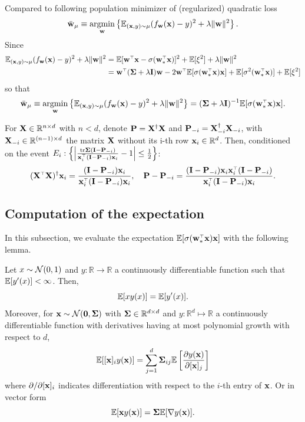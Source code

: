 \documentclass[11pt]{article}
\begin{document}
Compared to following population minimizer of (regularized) quadratic loss
\[
  \bar {\mathbf w}_\mu \equiv \operatorname*{\mathop{\mathrm{argmin}}}_\mathbf w \left\{ \mathbb E_{(\mathbf x,y) \sim \mu} (f_\mathbf w(\mathbf x) - y)^2 + \lambda \| \mathbf w \|^2 \right\}.
\]
Since 
\begin{align*}
  \E_{(\x,y) \sim \mu} (f_\w(\x) - y)^2 + \lambda \| \w \|^2 &= \E[\w^\top \x - \sigma(\w_*^\top \x)]^2 + \E[\xi^2]+ \lambda \| \w \|^2 \\ 
  & = \w^\top (\Sigmab + \lambda \I) \w - 2 \w^\top \E[\sigma(\w_*^\top \x) \x] + \E[\sigma^2(\w_*^\top \x)] + \E[\xi^2]
\end{align*}
so that 
\[
  \bar \w_\mu \equiv \argmin_\w \left\{ \E_{(\x,y) \sim \mu} (f_\w(\x) - y)^2 + \lambda \| \w \|^2 \right\} = (\Sigmab + \lambda \I)^{-1} \E[\sigma(\w_*^\top \x) \x].
\]


\begin{lemma}\label{lem:rank-one-update}
    For $\mathbf X \in \mathbb R^{n \times d}$ with $n<d$, denote $\mathbf P = \mathbf X^\dagger \mathbf X$ and $\mathbf P_{-i} = \mathbf X_{-i}^\dagger \mathbf X_{-i}$, with $\mathbf X_{-i} \in \mathbb R^{(n-1) \times d}$ the matrix $\mathbf X$ without its i-th row $\mathbf x_i \in \mathbb R^d$. Then, conditioned on the event $E_i: \left\{ \left| \frac{\tr \Sigmab (\I - \P_{-i})}{\x_i^\top (\I - \P_{-i}) \x_i} - 1 \right| \le \frac12 \right\}$:
    \begin{align*}
      (\X^\top\X)^\dagger\x_i = \frac{(\I - \P_{-i}) \x_i}{\x_i^\top (\I - \P_{-i}) \x_i}, \quad \P - \P_{-i} = \frac{(\I - \P_{-i}) \x_i \x_i^\top (\I - \P_{-i}) }{\x_i^\top (\I - \P_{-i}) \x_i}.
    \end{align*}
\end{lemma}

\subsection{Computation of the expectation}

In this subsection, we evaluate the expectation $\E[\sigma(\w_*^\top \x) \x]$ with the following lemma.

\begin{lemma}\label{lem:stein}
Let $x \sim \mathcal{N}(0,1)$ and $y: \mathbb R \to \mathbb R$ a continuously differentiable function such that $\mathbb E[y'(x)] < \infty$. Then,
\begin{equation}
  \mathbb E[x y(x)] = \mathbb E[y'(x)].
\end{equation}
Moreover, for $\mathbf x \sim \mathcal{N}(\mathbf 0, \mathbf{\Sigma})$ with $\mathbf{\Sigma} \in \mathbb R^{d \times d}$ and $y: \mathbb R^d \mapsto \mathbb R$ a continuously differentiable function with derivatives having at most polynomial growth with respect to $d$,
\begin{equation}
  \mathbb E[[\mathbf x]_i y(\mathbf x)] = \sum_{j=1}^d \mathbf{\Sigma}_{ij} \mathbb E \left[ \frac{\partial y(\mathbf x)}{\partial [\mathbf x]_j} \right]
\end{equation}
where $\partial/\partial [\mathbf x]_i$ indicates differentiation with respect to the $i$-th entry of $\mathbf x$. Or in vector form
\[
  \mathbb E[\mathbf x y(\mathbf x)] = \mathbf{\Sigma} \mathbb E[\nabla y(\mathbf x)].
\]
\end{lemma}
\end{document}

